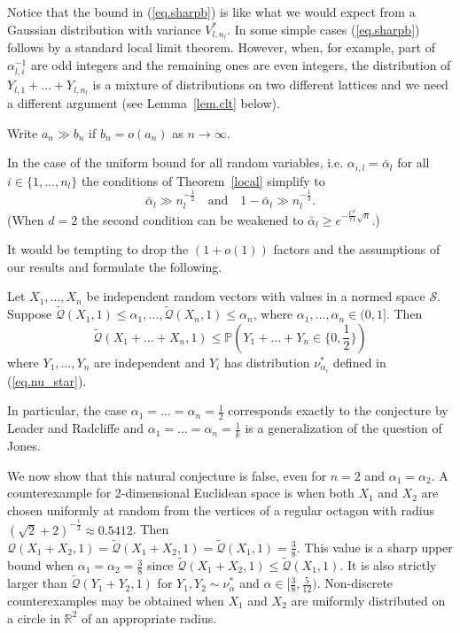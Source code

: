 \documentclass{article}
\newcommand{\pr}{\mathbb P}
\newcommand{\conc}{\mathcal{Q}}
\newcommand{\concdiam}{\tilde{\mathcal{Q}}}
\newcommand\nuopt[1]{\nu_{#1}^*}
\begin{document}
Notice that the bound in (\ref{eq.sharpb}) is like what we would expect from a Gaussian distribution with variance $V^*_{l, n_l}$. 
In some simple cases (\ref{eq.sharpb}) follows by a standard local limit theorem. However, when, for example, part of $\alpha_{l,i}^{-1}$ are odd integers and the remaining ones are even integers, the distribution of  $Y_{l, 1} + \dots + Y_{l, n_l}$ is a mixture of distributions on two different lattices and we need a different argument (see Lemma~\ref{lem.clt} below). 


Write $a_n \gg b_n$ if $b_n = o(a_n)$ as $n \to \infty$.
\begin{remark}\label{rmk.cormain} In the case of the uniform bound for all random variables, i.e. $\alpha_{i,l} = \bar{\alpha}_l$ for all $i\in\{1, \dots, n_l\}$ the conditions of Theorem~\ref{local} simplify to \begin{equation*}\label{eq.rmkcormain}
\bar{\alpha}_l \gg n_l^{- \frac 1 2} \quad \mbox{and} \quad 
1 - \bar{\alpha}_l \gg n_l^{-\frac 1 3}.
    \end{equation*}
    (When $d=2$ the second condition can be weakened to $\bar{\alpha}_l \ge e^{- \frac {C^2} {71} \sqrt{n}}$.)
\end{remark}


It would be tempting to drop the $(1+o(1))$ factors and the assumptions of our results and formulate the following.
\begin{conjecture}\label{conj.general}
    Let $X_1, \dots, X_n$ be independent random vectors with values in a normed space $\mathcal{S}$.
    Suppose $\concdiam(X_1,1) \le \alpha_1, \dots, \concdiam(X_n, 1) \le \alpha_n$, where $\alpha_1, \dots, \alpha_n \in (0,1]$. Then
    \[
        \concdiam(X_1+\dots+X_n, 1) \le \pr(Y_1 + \dots + Y_n \in \{0, \frac 1 2\})
    \]
    where $Y_1, \dots, Y_n$ are independent and $Y_i$ has distribution $\nuopt {\alpha_i}$ defined in (\ref{eq.nu_star}).
\end{conjecture}
In particular, the case $\alpha_1=\dots=\alpha_n=\frac 1 2$ corresponds exactly to the conjecture by Leader and Radcliffe and $\alpha_1=\dots=\alpha_n=\frac 1 k$ is a generalization of the question of Jones. 

We now show that this natural conjecture is false, even for $n=2$ and $\alpha_1=\alpha_2$.
A counterexample for 2-dimensional Euclidean space is when both $X_1$ and $X_2$ are chosen uniformly at random from the vertices of a regular octagon with radius $(\sqrt{2} + 2)^{-\frac 1 2} \approx 0.5412$. Then $\conc(X_1 + X_2, 1) = \concdiam(X_1+X_2, 1) = \concdiam(X_1, 1) = \frac 3 8$. This value is a sharp upper bound when $\alpha_1=\alpha_2=\frac 3 8$ since $\concdiam(X_1+X_2,1)\leq \concdiam(X_1,1)$. It is also strictly larger than $\concdiam(Y_1+Y_2, 1)$ for $Y_1, Y_2 \sim \nuopt \alpha$ and $\alpha \in [\frac 3 8, \frac 5 {12})$. Non-discrete counterexamples may be obtained when $X_1$ and $X_2$ are uniformly distributed on a circle in $\mathbb{R}^2$ of an appropriate radius.
\end{document}
